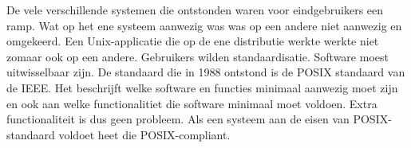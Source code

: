 De vele verschillende systemen die ontstonden waren voor eindgebruikers een ramp. Wat op het ene systeem aanwezig was was op een andere niet aanwezig en omgekeerd. Een Unix-applicatie die op de ene distributie werkte werkte niet zomaar ook op een andere. Gebruikers wilden standaardisatie. Software moest uitwisselbaar zijn. De standaard die in 1988 ontstond is de POSIX standaard van de IEEE. Het beschrijft welke software en functies minimaal aanwezig moet zijn en ook aan welke functionalitiet die software minimaal moet voldoen. Extra functionaliteit is dus geen probleem. Als een systeem aan de eisen van POSIX-standaard voldoet heet die POSIX-compliant.

